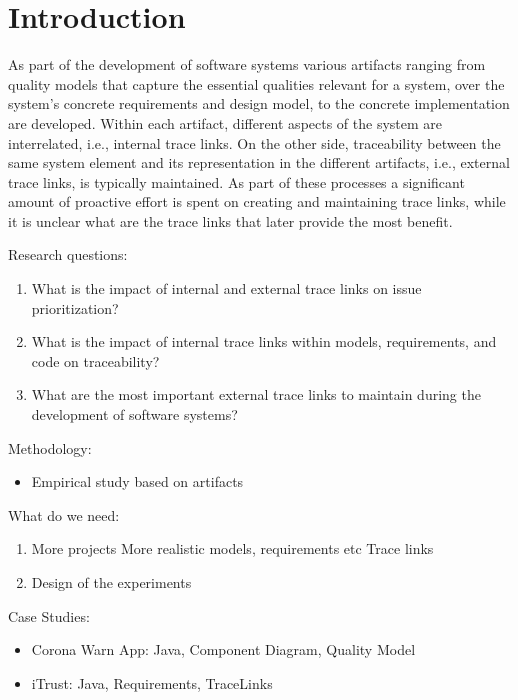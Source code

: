 \section{Introduction}
\label{sec:intro}
\noindent

As part of the development of software systems various artifacts ranging from quality models that capture the essential qualities relevant for a system, over the system's concrete requirements and design model, to the concrete implementation are developed. Within each artifact, different aspects of the system are interrelated, i.e., internal trace links. 
On the other side, traceability between the same system element and its representation in the different artifacts, i.e., external trace links, is typically maintained.
As part of these processes a significant amount of proactive effort is spent on creating and maintaining trace links, while it is unclear what are the trace links that later provide the most benefit.


Research questions:
\begin{enumerate}[label=\textbf{RQ\arabic*:}, ref=RQ\arabic*]
	\item What is the impact of internal and external trace links on issue prioritization?
	
	\item What is the impact of internal trace links within models, requirements, and code on traceability?
	
	\item What are the most important external trace links to maintain during the development of software systems?
	
\end{enumerate}

Methodology:
\begin{itemize}
	\item Empirical study based on artifacts
\end{itemize}

What do we need:
\begin{enumerate}
	\item More projects
	\subitem More realistic models, requirements etc
	\subitem Trace links
	\item Design of the experiments
\end{enumerate}

Case Studies:

\begin{itemize}
	\item Corona Warn App: Java, Component Diagram, Quality Model
	\item iTrust: Java, Requirements, TraceLinks
\end{itemize}

